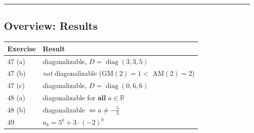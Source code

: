 \documentclass[a4paper,12pt]{article}
\begin{document}
\bigskip
\hrule
\bigskip

\subsection*{Overview: Results}

\begin{center}
\begin{tabular}{@{}ll@{}}
\toprule
Exercise & Result \\
\midrule
$47$ (a) & diagonalizable, $D = \operatorname{diag}(3,3,5)$ \\
$47$ (b) & \emph{not} diagonalizable (GM$(2)=1 <$ AM$(2)=2$) \\
$47$ (c) & diagonalizable, $D = \operatorname{diag}(0,6,6)$ \\[2pt]
$48$ (a) & diagonalizable for \textbf{all} $a \in \mathbb{R}$ \\
$48$ (b) & diagonalizable $\Leftrightarrow a \neq -\tfrac{5}{3}$ \\[2pt]
$49$ & $a_k = 5^k + 3\cdot(-2)^k$ \\
\bottomrule
\end{tabular}
\end{center}
\end{document}
